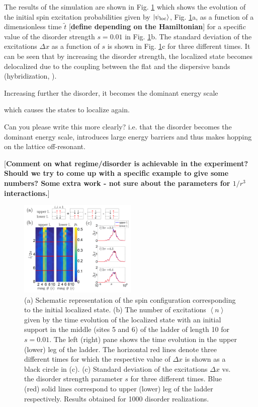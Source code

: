 \documentclass[prl,aps,twocolumn,showpacs,superscriptaddress,longbibliography]{revtex4-1}
\newcommand{\lan}{\left\langle}
\newcommand{\ran}{\right\rangle}
\newcommand{\av}[1]{\lan #1 \ran}
\newcommand{\ket}[1]{\left| #1 \ran}
\begin{document}
The results of the simulation are shown in Fig. \ref{Fig:time evolution} which shows the evolution of the initial spin excitation probabilities given by $\ket{\psi_{\rm loc}}$, Fig. \ref{Fig:time evolution}a, as a function of a dimensionless time $\tilde{t}$ [{\bf define depending on the Hamiltonian}] for a specific value of the disorder strength $s=0.01$ in Fig. \ref{Fig:time evolution}b. The standard deviation of the excitations $\Delta x$ as a function of $s$ is shown in Fig. \ref{Fig:time evolution}c for three different times. It can be seen that by increasing the disorder strength, the localized state becomes delocalized due to the coupling between the flat and the dispersive bands (hybridization, \cite{Leykam2017}). 

Increasing further the disorder, it becomes the dominant energy scale

 which causes the states to localize again. 

Can you please write this more clearly? i.e. that the disorder becomes the dominant energy scale, introduces large energy barriers and thus makes hopping on the lattice off-resonant.

[{\bf Comment on what regime/disorder is achievable in the experiment? Should we try to come up with a specific example to give some numbers? Some extra work - not sure about the parameters for $1/r^3$ interactions.}]

\begin{figure}

	      \includegraphics[width=0.5\textwidth]{graphics/time_evolution_CLS_PaperSupport_v3.pdf}
		\caption{(a) Schematic representation of the spin configuration corresponding to the initial localized state. (b) The number of excitations $\av{n}$ given by the time evolution of the localized state with an initial support in the middle (sites 5 and 6) of the ladder of length 10 for $s=0.01$. The left (right) pane shows the time evolution in the upper (lower) leg of the ladder. The horizontal red lines denote three different times for which the respective value of $\Delta x$ is shown as a black circle in (c). (c) Standard deviation of the excitations $\Delta x$ vs. the disorder strength parameter $s$ for three different times. Blue (red) solid lines correspond to upper (lower) leg of the ladder respectively. Results obtained for 1000 disorder realizations.}

 \label{Fig:time evolution}
   
\end{figure}  
\end{document}
